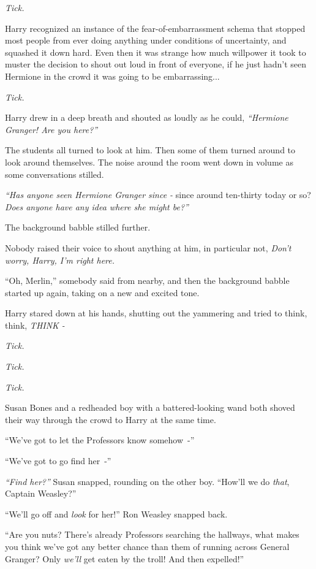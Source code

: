\emph{Tick.}

Harry recognized an instance of the fear-of-embarrassment schema that stopped most people from ever doing anything under conditions of uncertainty, and squashed it down hard. Even then it was strange how much willpower it took to muster the decision to shout out loud in front of everyone, if he just hadn't seen Hermione in the crowd it was going to be embarrassing...

\emph{Tick.}

Harry drew in a deep breath and shouted as loudly as he could, \emph{``Hermione Granger! Are you here?''}

The students all turned to look at him. Then some of them turned around to look around themselves. The noise around the room went down in volume as some conversations stilled.

\emph{``Has anyone seen Hermione Granger since -} since around ten-thirty today or so? \emph{Does anyone have any idea where she might be?''}

The background babble stilled further.

Nobody raised their voice to shout anything at him, in particular not, \emph{Don't worry, Harry, I'm right here.}

``Oh, Merlin,'' somebody said from nearby, and then the background babble started up again, taking on a new and excited tone.

Harry stared down at his hands, shutting out the yammering and tried to think, think, \emph{THINK -}

\emph{Tick.}

\emph{Tick.}

\emph{Tick.}

Susan Bones and a redheaded boy with a battered-looking wand both shoved their way through the crowd to Harry at the same time.

``We've got to let the Professors know somehow~-''

``We've got to go find her~-''

\emph{``Find her?''} Susan snapped, rounding on the other boy. ``How'll we do \emph{that}, Captain Weasley?''

``We'll go off and \emph{look} for her!'' Ron Weasley snapped back.

``Are you nuts? There's already Professors searching the hallways, what makes you think we've got any better chance than them of running across General Granger? Only \emph{we'll} get eaten by the troll! And then expelled!''

